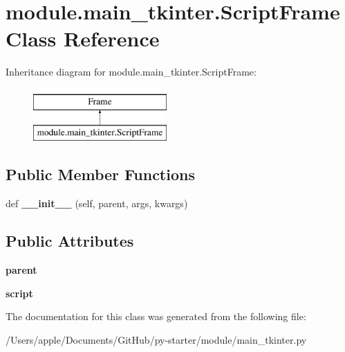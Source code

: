\hypertarget{classmodule_1_1main__tkinter_1_1_script_frame}{}\section{module.\+main\+\_\+tkinter.\+Script\+Frame Class Reference}
\label{classmodule_1_1main__tkinter_1_1_script_frame}
Inheritance diagram for module.\+main\+\_\+tkinter.\+Script\+Frame\+:\begin{figure}[H]
\begin{center}
\leavevmode
\includegraphics[height=2.000000cm]{classmodule_1_1main__tkinter_1_1_script_frame}
\end{center}
\end{figure}
\subsection*{Public Member Functions}
\begin{DoxyCompactItemize}
\item 
\mbox{\label{classmodule_1_1main__tkinter_1_1_script_frame_a0237eba3d07ddab81cf156b9caa9f022}} 
def {\bfseries \+\_\+\+\_\+init\+\_\+\+\_\+} (self, parent, args, kwargs)
\end{DoxyCompactItemize}
\subsection*{Public Attributes}
\begin{DoxyCompactItemize}
\item 
\mbox{\label{classmodule_1_1main__tkinter_1_1_script_frame_aea3087a23a015b744e6a2164518c08d7}} 
{\bfseries parent}
\item 
\mbox{\label{classmodule_1_1main__tkinter_1_1_script_frame_a14ddfa23d3c3a020d4de18ce038f449b}} 
{\bfseries script}
\end{DoxyCompactItemize}


The documentation for this class was generated from the following file\+:\begin{DoxyCompactItemize}
\item 
/\+Users/apple/\+Documents/\+Git\+Hub/py-\/starter/module/main\+\_\+tkinter.\+py\end{DoxyCompactItemize}
